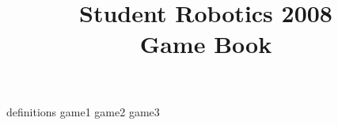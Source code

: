 \documentclass[a4paper, 12pt]{article}
\begin{document}
\title {Student Robotics 2008\\Game Book}

\maketitle

\tableofcontents
 {definitions}
 {game1}
 {game2}
 {game3}
\end{document}
